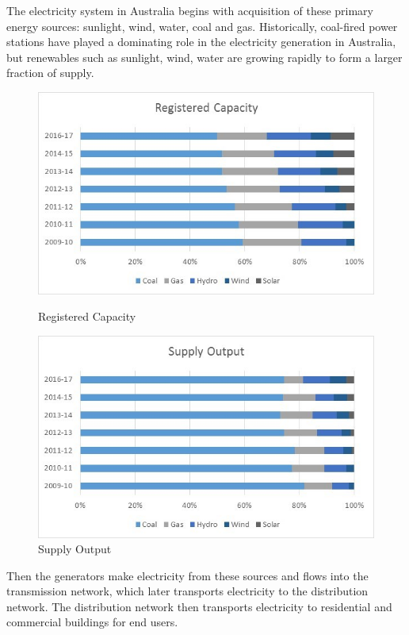 \documentclass[12pt]{article}
\begin{document}
\begin{flushleft}
The electricity system in Australia begins with acquisition of these primary energy sources: sunlight, wind, water, coal and gas.\parencite{aemc1} Historically, coal-fired power stations have played a dominating role in the electricity generation in Australia, but renewables such as sunlight, wind, water are growing rapidly to form a larger fraction of supply.\parencite{aer1} \par
\begin{figure}[!h]
  \centering
  \begin{minipage}[b]{0.45\textwidth}
    \includegraphics[width=\textwidth]{Registered_capacity.jpg}
    \caption{Registered Capacity}
  \end{minipage}
  \hfill
  \begin{minipage}[b]{0.45\textwidth}
    \includegraphics[width=\textwidth]{supply_output.jpg}
    \caption{Supply Output}
  \end{minipage}
\end{figure}
Then the generators make electricity from these sources and flows into the transmission network, which later transports electricity to the distribution network. The distribution network then transports electricity to residential and commercial buildings for end users.\parencite{aemc1}

\end{flushleft}
\end{document}
